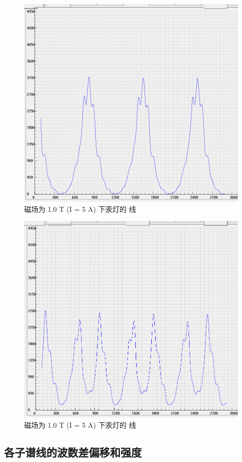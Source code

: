 \documentclass[font=default]{mpltx}
\begin{document}
\begin{figure}[htbp]
  \centering
  \includegraphics[width=0.85\linewidth]{fig/塞曼实验效应结果5PI.dat.bmp}
  \caption{磁场为 1.0 T (I = 5 A) 下汞灯的 \pi 线}
  \label{fig:551}
\end{figure}
\begin{figure}[htbp]
  \centering
  \includegraphics[width=0.85\linewidth]{fig/塞曼实验效应结果5SIGMA1.dat.bmp}
  \caption{磁场为 1.0 T (I = 5 A) 下汞灯的 \sigma 线}
  \label{fig:552}
\end{figure}

\subsection{各子谱线的波数差偏移和强度}
\end{document}
